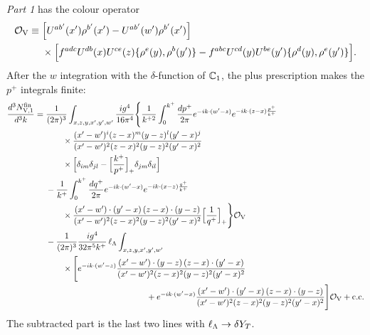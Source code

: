 \emph{Part 1} has the colour operator
\begin{align}
\mathcal{O}_{\rm V}\equiv{}&\Big[U^{ab'}(x')\rho^{b'}(x')-U^{ab'}(w')\rho^{b'}(x')\Big]\notag\\
&\times\Big[f^{adc}U^{db}(x)U^{ce}(z)\{\rho^e(y),\rho^b(y')\}-f^{abc}U^{cd}(y)U^{be}(y')\{\rho^d(y),\rho^e(y')\}\Big].
\end{align}
After the $w$ integration with the $\delta$-function of $\mathbb{C}_1$, the plus prescription makes the $p^+$ integrals finite:
\begin{align}
\frac{d^3N^{\rm fin}_{\rm V,1}}{d^3k}={}&\frac{1}{(2\pi)^3}\int_{x,z,y,x',y',w'}\frac{ig^4}{16\pi^4}\Bigg\{\frac{1}{k^{+2}}\int_0^{k^+}\frac{dp^+}{2\pi}e^{-ik\cdot(w'-z)}e^{-ik\cdot(z-x)\frac{p^+}{k^+}}\notag\\
&\qquad\times\frac{(x'-w')^i(z-x)^m(y-z)^l(y'-x)^j}{(x'-w')^2(z-x)^2(y-z)^2(y'-x)^2}\notag\\
&\qquad\times\Big[\delta_{im}\delta_{jl}-\Big[\frac{k^+}{p^+}\Big]_+\delta_{jm}\delta_{il}\Big]\notag\\
&-\frac{1}{k^+}\int_0^{k^+}\frac{dq^+}{2\pi}e^{-ik\cdot(w'-x)}e^{-ik\cdot(x-z)\frac{q^+}{k^+}}\notag\\
&\qquad\times\frac{(x'-w')\cdot(y'-x)\,(z-x)\cdot(y-z)}{(x'-w')^2(z-x)^2(y-z)^2(y'-x)^2}\Big[\frac{1}{q^+}\Big]_+\Bigg\}\Ord_{\rm V}\notag\\
&-\frac{1}{(2\pi)^3}\frac{ig^4}{32\pi^5k^+}\,\lL\int_{x,z,y,x',y',w'}\notag\\
&\qquad\times\Bigg[e^{-ik\cdot(w'-z)}\frac{(x'-w')\cdot(y-z)\,(z-x)\cdot(y'-x)}{(x'-w')^2(z-x)^2(y-z)^2(y'-x)^2}\notag\\
&\hspace{12em}+e^{-ik\cdot(w'-x)}\frac{(x'-w')\cdot(y'-x)\,(z-x)\cdot(y-z)}{(x'-w')^2(z-x)^2(y-z)^2(y'-x)^2}\Bigg]\Ord_{\rm V}+{\rm c.c.}
\label{eq:finV1}
\end{align}
The subtracted part is the last two lines with $\ell_{\Lambda}\to\delta Y_T$.

